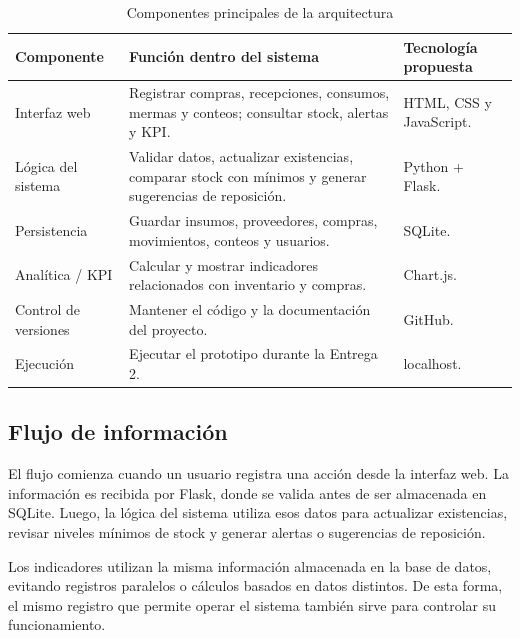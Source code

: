 \documentclass[11pt,letterpaper]{article}
\begin{document}
\begin{table}[H]
\centering
\caption{Componentes principales de la arquitectura}
\label{tab:componentes_arq}
\begin{tabularx}{\textwidth}{p{}Xp{}}
\toprule
\textbf{Componente} & \textbf{Función dentro del sistema} & \textbf{Tecnología propuesta} \\
\midrule

Interfaz web &
Registrar compras, recepciones, consumos, mermas y conteos; consultar stock, alertas y KPI. &
HTML, CSS y JavaScript. \\

Lógica del sistema &
Validar datos, actualizar existencias, comparar stock con mínimos y generar sugerencias de reposición. &
Python + Flask. \\

Persistencia &
Guardar insumos, proveedores, compras, movimientos, conteos y usuarios. &
SQLite. \\

Analítica / KPI &
Calcular y mostrar indicadores relacionados con inventario y compras. &
Chart.js. \\

Control de versiones &
Mantener el código y la documentación del proyecto. &
GitHub. \\

Ejecución &
Ejecutar el prototipo durante la Entrega 2. &
localhost. \\

\bottomrule
\end{tabularx}
\end{table}

\subsection{Flujo de información}

El flujo comienza cuando un usuario registra una acción desde la interfaz web. La información es recibida por Flask, donde se valida antes de ser almacenada en SQLite. Luego, la lógica del sistema utiliza esos datos para actualizar existencias, revisar niveles mínimos de stock y generar alertas o sugerencias de reposición.

Los indicadores utilizan la misma información almacenada en la base de datos, evitando registros paralelos o cálculos basados en datos distintos. De esta forma, el mismo registro que permite operar el sistema también sirve para controlar su funcionamiento.
\end{document}
